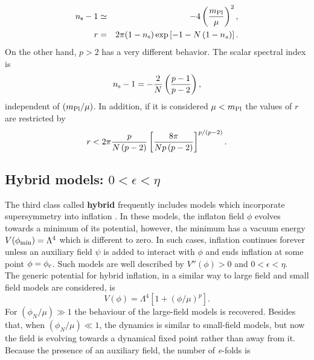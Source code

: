 \documentclass{rmaa}
\def\bea{\begin{eqnarray}}
\def\eea{\end{eqnarray}}
\begin{document}
\bea
n_{\rm s}-1&\simeq& -4\left( \frac{m_{\rm Pl}}{\mu}\right)^2, \nonumber \\
r &=& 2\pi (1 - n_{\rm s}) \exp\left[- 1 - N\left(1 - n_s\right)\right].
\eea
%
%
On the other
hand, $p > 2$ has a very different behavior. The scalar spectral index is
\begin{equation}
n_{\rm s}-1 = - {2 \over N} \left({p - 1 \over p - 2}\right),
\end{equation}
independent of $(m_{\rm Pl}/\mu)$. In addition, if it is considered $\mu < m_{\rm Pl}$ 
the values of $r$ are restricted by
\begin{equation}
r < 2\pi {p \over N \left(p - 2\right)} \left[{8 \pi \over N p \left(p -
2\right)}\right]^{p / \left(p - 2\right)}.
\end{equation}


\subsection{Hybrid models: $0 < \epsilon < \eta$}

The third class called \textbf{hybrid} frequently includes
models which incorporate supersymmetry into inflation \citep{Linde3, Copeland}. 
In these models, the inflaton field $\phi$ evolves
towards a minimum of its potential, however, the minimum has a vacuum energy 
$V(\phi_{\rm min}) = \Lambda^4$ which is different to zero. 
In such cases, inflation continues forever unless an
auxiliary field $\psi$ is added to interact with $\phi$ and ends inflation at some point $\phi = \phi_{\rm c}$. 
 Such models are well described by $V''\left(\phi\right) > 0$ and $0 < \epsilon < \eta$. 
\\

The generic potential for hybrid inflation, in a similar way to large field and small field models
are considered, is
\begin{equation}
V\left(\phi\right) = \Lambda^4 \left[1 + \left(\phi / \mu\right)^p\right].
\end{equation}
%
For $\left({\phi_N / \mu}\right)\gg 1$ the behaviour of
 the large-field models is recovered. Besides that, when $\left({\phi_N /
\mu}\right)\ll 1$, the dynamics is similar to small-field models, but
now the field is evolving towards a dynamical fixed point rather than away from it.  
%
Because the presence of an auxiliary field, the number of {\it e}-folds is
\end{document}
